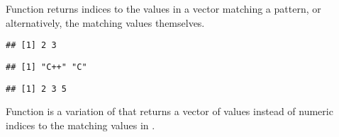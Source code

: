 \documentclass[krantz2]{krantz}\usepackage{knitr}
\begin{document}
Function  returns indices to the values in a vector matching a pattern, or alternatively, the matching values themselves.

\begin{knitrout}\footnotesize
{}\color{fgcolor}\begin{kframe}
\begin{alltt}
\hlstd{(} \hlstd{=} \hlstd{,}  \hlstd{=} \hlstd{(}\hlstd{,} \hlstd{,} \hlstd{,} \hlstd{,} \hlstd{))}
\end{alltt}
\begin{verbatim}
## [1] 2 3
\end{verbatim}
\begin{alltt}
\hlstd{(} \hlstd{=} \hlstd{,}  \hlstd{=} \hlstd{(}\hlstd{,} \hlstd{,} \hlstd{,} \hlstd{,} \hlstd{),}  \hlstd{=} \hlstd{)}
\end{alltt}
\begin{verbatim}
## [1] "C++" "C"
\end{verbatim}
\begin{alltt}
\hlstd{(} \hlstd{=} \hlstd{,}  \hlstd{=} \hlstd{(}\hlstd{,} \hlstd{,} \hlstd{,} \hlstd{,} \hlstd{),}  \hlstd{=} \hlstd{)}
\end{alltt}
\begin{verbatim}
## [1] 2 3 5
\end{verbatim}
\end{kframe}
\end{knitrout}

Function  is a variation of  that returns a vector of  values instead of numeric indices to the matching values in .
\end{document}
